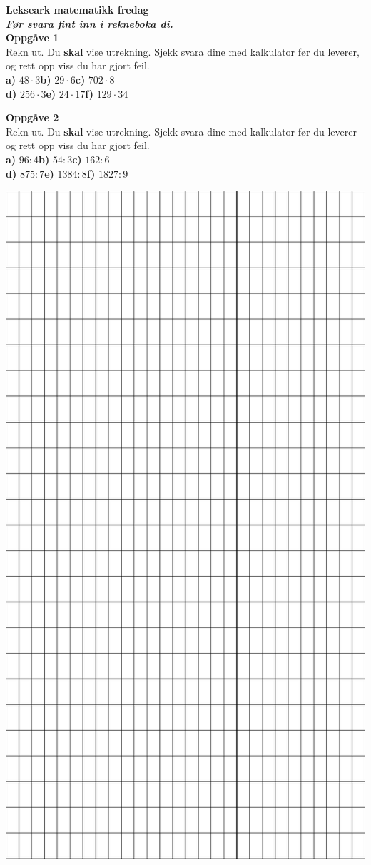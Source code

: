 \documentclass[english,hidelinks,pdftex, 11 pt, class=report,crop=false]{standalone}
\begin{document}
\huge \textbf{Lekseark matematikk fredag} \\[25pt]
\large
\textit{\textbf{Før svara fint inn i rekneboka di.}} \\[15pt]
{\Large \textbf{Oppgåve 1}}\\[10pt]
Rekn ut. Du \textbf{skal} vise utrekning. Sjekk svara dine med kalkulator før du leverer, og rett opp viss du har gjort feil. \\[10pt]
\textbf{a)} $ 48\cdot3 $\qquad \textbf{b)} $ 29\cdot6 $\qquad \textbf{c)} $ 702\cdot8 $\\[12pt]
\textbf{d)} $ 256\cdot3 $\qquad \textbf{e)} $ 24\cdot 17 $\qquad \textbf{f)} $ 129\cdot 34 $ \vspace{30pt}

{\Large \textbf{Oppgåve 2}}\\[10pt]
Rekn ut. Du \textbf{skal} vise utrekning. Sjekk svara dine med kalkulator før du leverer og rett opp viss du har gjort feil. \\[10pt]
\textbf{a)} $ 96:4 $\qquad \textbf{b)} $ 54:3  $\qquad \textbf{c)} $ 162:6 $\\[12pt]
\textbf{d)} $ 875:7 $\qquad \textbf{e)} $ 1384:8$\qquad \textbf{f)} $ 1827:9  $
\begin{center}
	\includegraphics[]{sheet}
\end{center}
\end{document}
